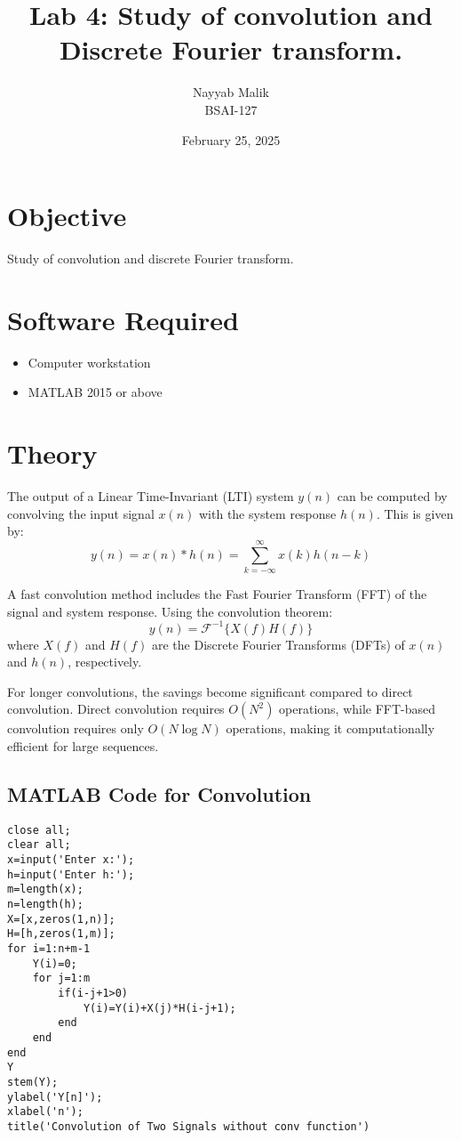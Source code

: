 \documentclass[a4paper,12pt]{article}
\title{\textbf{Lab 4: Study of convolution and
 Discrete Fourier transform.}}
\author{Nayyab Malik\\BSAI-127}
\date{February 25, 2025}
\begin{document}
\maketitle
\tableofcontents
\newpage
\section{Objective}
Study of convolution and discrete Fourier transform.

\section{Software Required}
\begin{itemize}
    \item Computer workstation
    \item MATLAB 2015 or above
\end{itemize}

\section{Theory}
The output of a Linear Time-Invariant (LTI) system $y(n)$ can be computed by convolving the input signal $x(n)$ with the system response $h(n)$. This is given by:
\begin{equation}
    y(n) = x(n) * h(n) = \sum_{k=-\infty}^{\infty} x(k) h(n-k)
\end{equation}

A fast convolution method includes the Fast Fourier Transform (FFT) of the signal and system response. Using the convolution theorem:
\begin{equation}
    y(n) = \mathcal{F}^{-1} \{ X(f) H(f) \}
\end{equation}
where $X(f)$ and $H(f)$ are the Discrete Fourier Transforms (DFTs) of $x(n)$ and $h(n)$, respectively.

For longer convolutions, the savings become significant compared to direct convolution. Direct convolution requires $O(N^2)$ operations, while FFT-based convolution requires only $O(N \log N)$ operations, making it computationally efficient for large sequences.
\subsection{MATLAB Code for Convolution}
\begin{verbatim}
close all;
clear all;
x=input('Enter x:');
h=input('Enter h:');
m=length(x);
n=length(h);
X=[x,zeros(1,n)];
H=[h,zeros(1,m)];
for i=1:n+m-1
    Y(i)=0;
    for j=1:m
        if(i-j+1>0)
            Y(i)=Y(i)+X(j)*H(i-j+1);
        end
    end
end
Y
stem(Y);
ylabel('Y[n]');
xlabel('n');
title('Convolution of Two Signals without conv function')
\end{verbatim}
\end{document}
